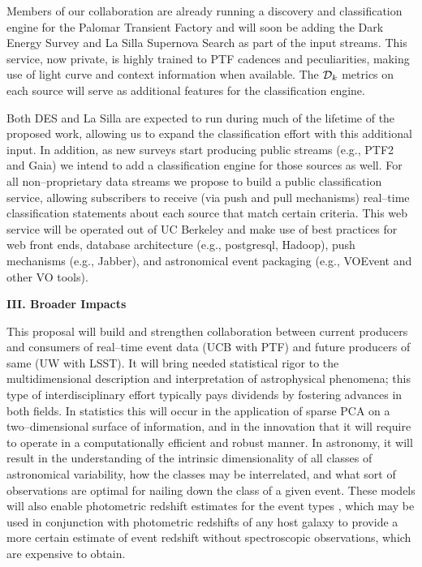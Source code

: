  \smallskip

Members of our collaboration are already running a discovery and classification
engine for the Palomar Transient Factory and will soon be adding the Dark Energy
Survey and La Silla Supernova Search as part of the input streams.  This
service, now private, is highly trained to PTF cadences and peculiarities,
making use of light curve and context information when available. The ${\cal
D}_k$ metrics on each source will serve as additional features for the
classification engine.

Both DES and La Silla are expected to run during much of the lifetime of the
proposed work, allowing us to expand the classification effort with this
additional input. In addition, as new surveys start producing public streams
(e.g., PTF2 and Gaia) we intend to add a classification engine for those sources
as well.  For all non--proprietary data streams we propose to build a public
classification service, allowing subscribers to receive (via push and pull
mechanisms) real--time classification statements about each source that match
certain criteria. This web service will be operated out of UC Berkeley and make
use of best practices for web front ends, database architecture (e.g.,
postgresql, Hadoop), push mechanisms (e.g., Jabber), and astronomical event
packaging (e.g., VOEvent and other VO tools).


\bigskip \centerline{\bf III. Broader Impacts} \smallskip

This proposal will build and strengthen collaboration between current producers
and consumers of real--time event data (UCB with PTF) and future producers of
same (UW with LSST).  It will bring needed statistical rigor to the
multidimensional description and interpretation of astrophysical phenomena; this
type of interdisciplinary effort typically pays dividends by fostering advances
in both fields.  In statistics this will occur in the application of sparse PCA
on a two--dimensional surface of information, and in the innovation that it will
require to operate in a computationally efficient and robust manner.  In
astronomy, it will result in the understanding of the intrinsic dimensionality
of all classes of astronomical variability, how the classes may be interrelated,
and what sort of observations are optimal for nailing down the class of a given
event.  These models will also enable photometric redshift estimates for the
event types \citep[e.g.][]{2010ApJ...717...40K}, which may be used in
conjunction with photometric redshifts of any host galaxy
\citep[e.g.][]{1962IAUS...15..390B} to provide a more certain estimate of event
redshift without spectroscopic observations, which are expensive to obtain.

